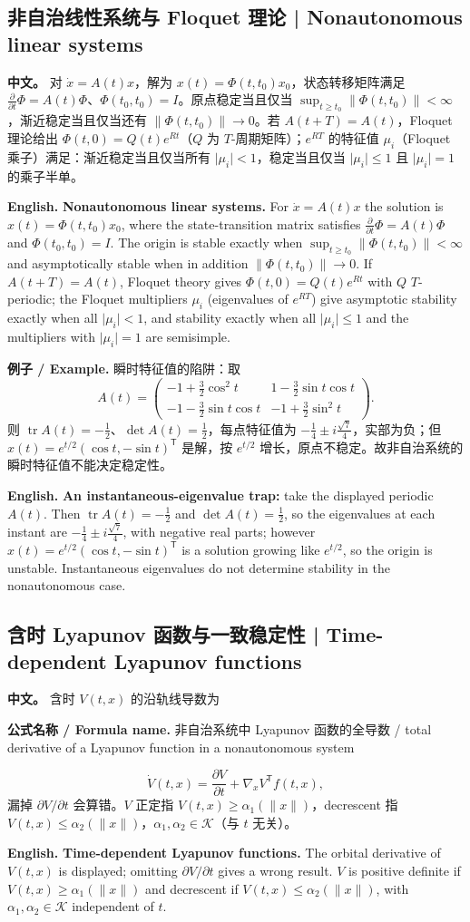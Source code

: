 \documentclass[UTF8,11pt,a4paper]{ctexart}
\newcommand{\EN}[1]{\par\noindent\textbf{English.} #1\par}
\newcommand{\FORMULA}[2]{\par\noindent\textbf{公式名称 / Formula name.} #1 / #2\par}
\newcommand{\EX}[2]{\par\noindent\textbf{例子 / Example.} #1\par\EN{#2}}
\newcommand{\APS}[2]{\par\noindent\textbf{中文。} #1\par\noindent\textbf{English.} #2\par}
\newcommand{\norm}[1]{\lVert #1\rVert}\newcommand{\abs}[1]{\lvert #1\rvert}
\begin{document}
\subsection{非自治线性系统与 Floquet 理论 | Nonautonomous linear systems}
\APS{对 $\dot x=A(t)x$，解为 $x(t)=\Phi(t,t_0)x_0$，状态转移矩阵满足 $\frac{\partial}{\partial t}\Phi=A(t)\Phi$、$\Phi(t_0,t_0)=I$。原点稳定当且仅当 $\sup_{t\ge t_0}\norm{\Phi(t,t_0)}<\infty$，渐近稳定当且仅当还有 $\norm{\Phi(t,t_0)}\to0$。若 $A(t+T)=A(t)$，Floquet 理论给出 $\Phi(t,0)=Q(t)e^{Rt}$（$Q$ 为 $T$-周期矩阵）；$e^{RT}$ 的特征值 $\mu_i$（Floquet 乘子）满足：渐近稳定当且仅当所有 $\abs{\mu_i}<1$，稳定当且仅当 $\abs{\mu_i}\le1$ 且 $\abs{\mu_i}=1$ 的乘子半单。}{\textbf{Nonautonomous linear systems.} For $\dot x=A(t)x$ the solution is $x(t)=\Phi(t,t_0)x_0$, where the state-transition matrix satisfies $\frac{\partial}{\partial t}\Phi=A(t)\Phi$ and $\Phi(t_0,t_0)=I$. The origin is stable exactly when $\sup_{t\ge t_0}\norm{\Phi(t,t_0)}<\infty$ and asymptotically stable when in addition $\norm{\Phi(t,t_0)}\to0$. If $A(t+T)=A(t)$, Floquet theory gives $\Phi(t,0)=Q(t)e^{Rt}$ with $Q$ $T$-periodic; the Floquet multipliers $\mu_i$ (eigenvalues of $e^{RT}$) give asymptotic stability exactly when all $\abs{\mu_i}<1$, and stability exactly when all $\abs{\mu_i}\le1$ and the multipliers with $\abs{\mu_i}=1$ are semisimple.}

\EX{瞬时特征值的陷阱：取
\[
A(t)=\begin{pmatrix}
-1+\frac32\cos^2t & 1-\frac32\sin t\cos t\\[1pt]
-1-\frac32\sin t\cos t & -1+\frac32\sin^2t
\end{pmatrix}.
\]
则 $\operatorname{tr}A(t)=-\frac12$、$\det A(t)=\frac12$，每点特征值为 $-\frac14\pm i\frac{\sqrt7}{4}$，实部为负；但 $x(t)=e^{t/2}(\cos t,-\sin t)^{\mathsf T}$ 是解，按 $e^{t/2}$ 增长，原点不稳定。故非自治系统的瞬时特征值不能决定稳定性。}{\textbf{An instantaneous-eigenvalue trap:} take the displayed periodic $A(t)$. Then $\operatorname{tr}A(t)=-\frac12$ and $\det A(t)=\frac12$, so the eigenvalues at each instant are $-\frac14\pm i\frac{\sqrt7}{4}$, with negative real parts; however $x(t)=e^{t/2}(\cos t,-\sin t)^{\mathsf T}$ is a solution growing like $e^{t/2}$, so the origin is unstable. Instantaneous eigenvalues do not determine stability in the nonautonomous case.}

\subsection{含时 Lyapunov 函数与一致稳定性 | Time-dependent Lyapunov functions}
\APS{含时 $V(t,x)$ 的沿轨线导数为
\FORMULA{非自治系统中 Lyapunov 函数的全导数}{total derivative of a Lyapunov function in a nonautonomous system}
\[
\dot V(t,x)=\frac{\partial V}{\partial t}+\nabla_xV^{\mathsf T}f(t,x),
\]
漏掉 $\partial V/\partial t$ 会算错。$V$ 正定指 $V(t,x)\ge\alpha_1(\norm{x})$，decrescent 指 $V(t,x)\le\alpha_2(\norm{x})$，$\alpha_1,\alpha_2\in\mathcal K$（与 $t$ 无关）。}{\textbf{Time-dependent Lyapunov functions.} The orbital derivative of $V(t,x)$ is displayed; omitting $\partial V/\partial t$ gives a wrong result. $V$ is positive definite if $V(t,x)\ge\alpha_1(\norm{x})$ and decrescent if $V(t,x)\le\alpha_2(\norm{x})$, with $\alpha_1,\alpha_2\in\mathcal K$ independent of $t$.}
\end{document}
